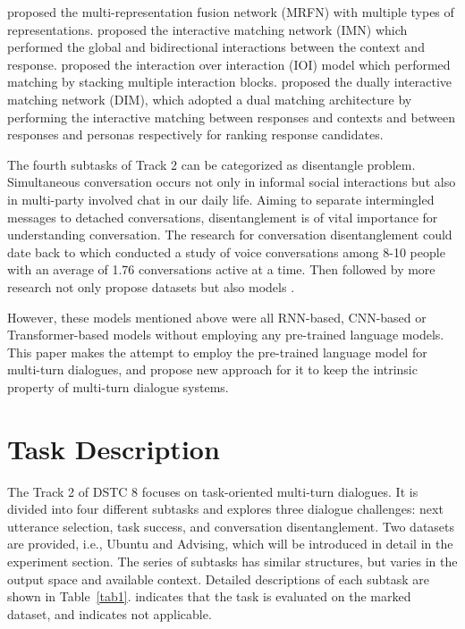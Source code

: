 \documentclass[letterpaper]{article} \usepackage{aaai20}  \usepackage{times}  \usepackage{helvet} \usepackage{courier}  \usepackage[hyphens]{url}  \usepackage{graphicx} \urlstyle{rm} \def\UrlFont{\rm}  \usepackage{graphicx}  \frenchspacing  \setlength{\pdfpagewidth}{8.5in}  \setlength{\pdfpageheight}{11in}
\begin{document}
  \cite{DBLP:conf/wsdm/TaoWXHZY19} proposed the multi-representation fusion network (MRFN) with multiple types of representations.
  \cite{Gu:2019:IMN:3357384.3358140} proposed the interactive matching network (IMN) which performed the global and bidirectional interactions between the context and response.
  \cite{DBLP:conf/acl/TaoWXHZY19} proposed the interaction over interaction (IOI) model which performed matching by stacking multiple interaction blocks.
  \cite{gu-etal-2019-dually} proposed the dually interactive matching network (DIM), which adopted a dual matching architecture by performing the interactive matching between responses and contexts and between responses and personas respectively for ranking response candidates.



  The fourth subtasks of Track 2 can be categorized as disentangle problem.
  Simultaneous conversation occurs not only in informal social interactions but also in multi-party involved chat in our daily life.
  Aiming to separate intermingled messages to detached conversations, disentanglement is of vital importance for understanding conversation.
  The research for conversation disentanglement could date back to \cite{DBLP:journals/corr/abs-cs-0608083} which conducted a study of voice conversations among 8-10 people with an average of 1.76 conversations active at a time.
  Then followed by more research not only propose datasets \cite{mehri2017chat,riou:hal-01698147,kummerfeld2019large} but also models \cite{mehri2017chat,jiang2018learning}.

  However, these models mentioned above were all RNN-based, CNN-based or Transformer-based models without employing any pre-trained language models.
  This paper makes the attempt to employ the pre-trained language model for multi-turn dialogues, and propose new approach for it to keep the intrinsic property of multi-turn dialogue systems.


\section{Task Description}

  The Track 2 of DSTC 8 focuses on task-oriented multi-turn dialogues.
  It is divided into four different subtasks and explores three dialogue challenges: next utterance selection, task success, and conversation disentanglement.
  Two datasets are provided, i.e., Ubuntu and Advising, which will be introduced in detail in the experiment section.
  The series of subtasks has similar structures, but varies in the output space and available context.
  Detailed descriptions of each subtask are shown in Table~\ref{tab1}.
  \CheckmarkBold indicates that the task is evaluated on the marked dataset, and \XSolidBrush indicates not applicable.
\end{document}
